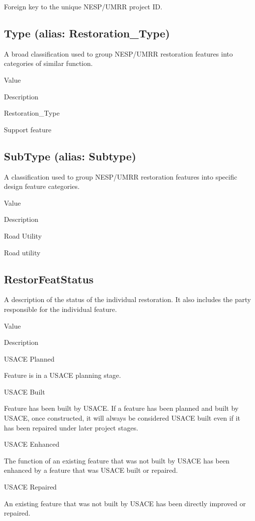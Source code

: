 \documentclass[
  letterpaper,
  DIV=11,
  numbers=noendperiod]{scrreprt}
\begin{document}
Foreign key to the unique NESP/UMRR project ID.

\subsection{Type (alias:
Restoration\_Type)}\label{type-alias-restoration_type-3}

A broad classification used to group NESP/UMRR restoration features into
categories of similar function.

Value

Description

Restoration\_Type

Support feature

\subsection{SubType (alias: Subtype)}\label{subtype-alias-subtype-22}

A classification used to group NESP/UMRR restoration features into
specific design feature categories.

Value

Description

Road Utility

Road utility

\subsection{RestorFeatStatus}\label{restorfeatstatus-22}

A description of the status of the individual restoration. It also
includes the party responsible for the individual feature.

Value

Description

USACE Planned

Feature is in a USACE planning stage.

USACE Built

Feature has been built by USACE. If a feature has been planned and built
by USACE, once constructed, it will always be considered USACE built
even if it has been repaired under later project stages.

USACE Enhanced

The function of an existing feature that was not built by USACE has been
enhanced by a feature that was USACE built or repaired.

USACE Repaired

An existing feature that was not built by USACE has been directly
improved or repaired.
\end{document}
